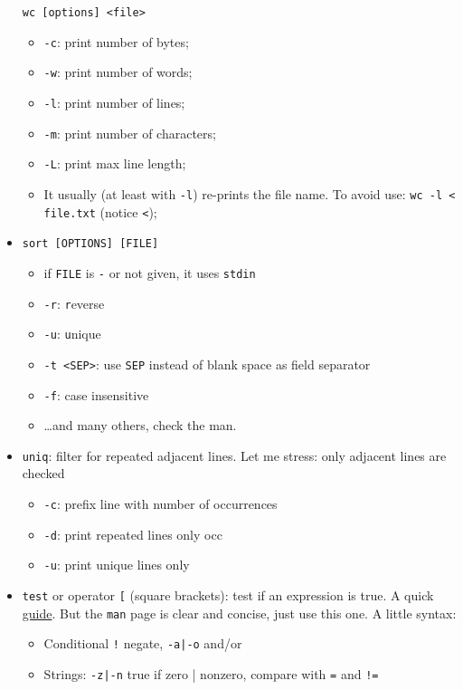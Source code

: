 \documentclass[a4paper,12pt,%
              final%
              ]{article}
\begin{document}
\begin{itemize}
\begin{verbatim}
wc [options] <file>
\end{verbatim}
    \begin{itemize}
      \item \verb|-c|: print number of bytes;
      \item \verb|-w|: print number of words;
      \item \verb|-l|: print number of lines;
      \item \verb|-m|: print number of characters;
      \item \verb|-L|: print max line length;
      \item It usually (at least with \verb|-l|) re-prints the file name. To avoid use: \verb|wc -l < file.txt| (notice \verb|<|);
    \end{itemize}
  \item \texttt{sort [OPTIONS] [FILE]}
    \begin{itemize}
      \item if \texttt{FILE} is \texttt{-} or not given, it uses \texttt{stdin}
      \item \verb|-r|: \texttt{r}everse
      \item \verb|-u|: \texttt{u}nique
      \item \verb|-t <SEP>|: use \texttt{SEP} instead of blank space as field separator
      \item \verb|-f|: case insensitive
      \item \ldots and many others, check the man.
    \end{itemize}
  \item \texttt{uniq}: filter for repeated adjacent lines. Let me stress: only adjacent lines are checked
    \begin{itemize}
      \item \verb|-c|: prefix line with number of occurrences
      \item \verb|-d|: print repeated lines only occ
      \item \verb|-u|: print unique lines only
    \end{itemize}
  \item \texttt{test} or operator \verb|[| (square brackets): test if an expression is true. A quick \href{https://www.computerhope.com/unix/test.htm}{guide}. But the \texttt{man} page is clear and concise, just use this one. A little syntax:
    \begin{itemize}
      \item Conditional \verb|!| negate, \verb!-a|-o! and/or
      \item Strings: \verb!-z|-n! true if zero | nonzero, compare with \verb|=| and \verb|!=|

\end{itemize}
\end{itemize}
\end{document}
